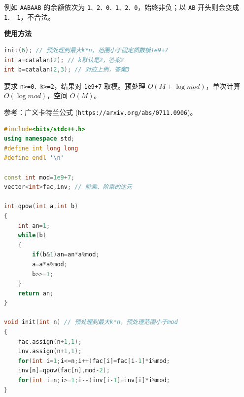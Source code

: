 \documentclass[10pt,landscape,a4paper]{article}
\begin{document}
\begin{multicols*}{3}
例如 \texttt{A\allowbreak{}A\allowbreak{}B\allowbreak{}A\allowbreak{}A\allowbreak{}B} 的余额依次为 \texttt{1\allowbreak{}、\allowbreak{}2\allowbreak{}、\allowbreak{}0\allowbreak{}、\allowbreak{}1\allowbreak{}、\allowbreak{}2\allowbreak{}、\allowbreak{}0}，始终非负；以 \texttt{A\allowbreak{}B} 开头则会变成 \texttt{1\allowbreak{}、\allowbreak{}-\allowbreak{}1}，不合法。\par
\par\addvspace{0.7ex}\noindent\textbf{使用方法}\par\nobreak
\begin{lstlisting}[language=C++,numbers=none,basicstyle=\footnotesize\ttfamily]
init(6); // 预处理到最大k*n，范围小于固定质数模1e9+7
int a=catalan(2); // k默认是2，答案2
int b=catalan(2,3); // 对应上例，答案3
\end{lstlisting}

要求 \texttt{n\allowbreak{}\textgreater{}\allowbreak{}=\allowbreak{}0\allowbreak{}、\allowbreak{}k\allowbreak{}\textgreater{}\allowbreak{}=\allowbreak{}2}，结果对 \texttt{1\allowbreak{}e\allowbreak{}9\allowbreak{}+\allowbreak{}7} 取模。预处理 $O(M+\log mod)$，单次计算 $O(\log mod)$，空间 $O(M)$。\par
参考：广义卡特兰公式 (\texttt{h\allowbreak{}t\allowbreak{}t\allowbreak{}p\allowbreak{}s\allowbreak{}:\allowbreak{}/\allowbreak{}/\allowbreak{}a\allowbreak{}r\allowbreak{}x\allowbreak{}i\allowbreak{}v\allowbreak{}.\allowbreak{}o\allowbreak{}r\allowbreak{}g\allowbreak{}/\allowbreak{}a\allowbreak{}b\allowbreak{}s\allowbreak{}/\allowbreak{}0\allowbreak{}7\allowbreak{}1\allowbreak{}1\allowbreak{}.\allowbreak{}0\allowbreak{}9\allowbreak{}0\allowbreak{}6})。\par
\par{}\par
\begin{lstlisting}[language=C++]
#include<bits/stdc++.h>
using namespace std;
#define int long long
#define endl '\n'

const int mod=1e9+7;
vector<int>fac,inv; // 阶乘、阶乘的逆元

int qpow(int a,int b)
{
    int an=1;
    while(b)
    {
        if(b&1)an=an*a%mod;
        a=a*a%mod;
        b>>=1;
    }
    return an;
}

void init(int n) // 预处理到最大k*n，预处理范围小于mod
{
    fac.assign(n+1,1);
    inv.assign(n+1,1);
    for(int i=1;i<=n;i++)fac[i]=fac[i-1]*i%mod;
    inv[n]=qpow(fac[n],mod-2);
    for(int i=n;i>=1;i--)inv[i-1]=inv[i]*i%mod;
}


\end{lstlisting}
\end{multicols*}
\end{document}
